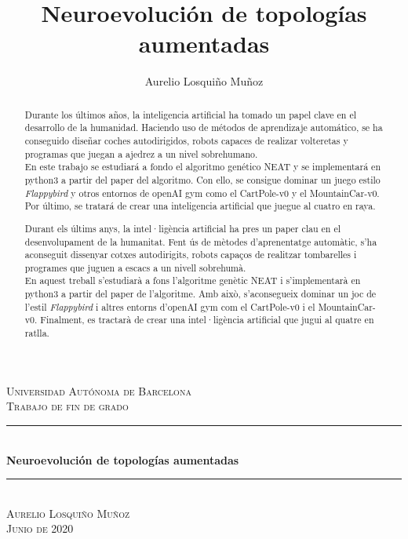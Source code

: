 \documentclass{article}
\title{Neuroevolución de topologías aumentadas}
\author{Aurelio Losquiño Muñoz}
\newcommand{\HRule}{\rule{\linewidth}{0.5mm}}
\begin{document}
\begin{titlepage}
\centering
\textsc{Universidad Autónoma de Barcelona}\\
\textsc{Trabajo de fin de grado}\\[1cm]
\HRule \\[0.4cm]
{ \huge \bfseries Neuroevolución de topologías aumentadas}\\[0.4cm]
\HRule \\[1.5cm]
\textsc{\large Aurelio Losquiño Muñoz}\\[0.5cm]
\textsc{Junio de 2020}
\end{titlepage}

\begin{abstract}
\setlength{\parindent}{0pt}
\noindent Durante los últimos años, la inteligencia artificial ha tomado un papel clave en el desarrollo de la humanidad. Haciendo uso de métodos de aprendizaje automático, se ha conseguido diseñar coches autodirigidos, robots capaces de realizar volteretas y programas que juegan a ajedrez a un nivel sobrehumano.\\

En este trabajo se estudiará a fondo el algoritmo genético NEAT y se implementará en python3 a partir del paper del algoritmo. Con ello, se consigue dominar un juego estilo \textit{Flappybird} y otros entornos de openAI gym como el CartPole-v0 y el MountainCar-v0. Por último, se tratará de crear una inteligencia artificial que juegue al cuatro en raya.

\end{abstract}
\begin{abstract}
\setlength{\parindent}{0pt}
\noindent Durant els últims anys, la intel·ligència artificial ha pres un paper clau en el desenvolupament de la humanitat. Fent ús de mètodes d'aprenentatge automàtic, s'ha aconseguit dissenyar cotxes autodirigits, robots capaços de realitzar tombarelles i programes que juguen a escacs a un nivell sobrehumà. \\

En aquest treball s'estudiarà a fons l'algoritme genètic NEAT i s'implementarà en python3 a partir del paper de l'algoritme. Amb això, s'aconsegueix dominar un joc de l'estil \textit{Flappybird} i altres entorns d'openAI gym com el CartPole-v0 i el MountainCar-v0. Finalment, es tractarà de crear una intel·ligència artificial que jugui al quatre en ratlla.
\end{abstract}
\end{document}
